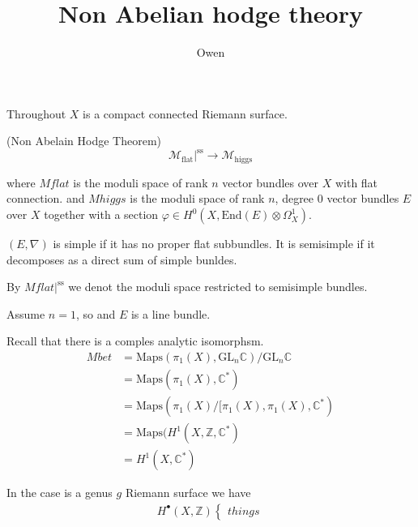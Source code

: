 % 


\title{Non Abelian hodge theory}
\author{Owen}
\date{}

 
\maketitle

Throughout $X$ is  a compact connected Riemann surface. 


\begin{theorem}
    (Non Abelain Hodge Theorem)
    \begin{equation}
        \mathcal{M}_{\mathrm{flat}}|^{\mathrm{ss}} \rightarrow  \mathcal{M}_{\mathrm{higgs}} 
    \end{equation}
\end{theorem}

where $Mflat$ is the moduli space of rank $n$ vector bundles over $X$ with flat connection. 
and $Mhiggs$ is the moduli space of rank $n$, degree $0$ vector bundles $E$ over $X$ together with a section $\varphi \in H^0 (X, \mathrm{End}(E) \otimes \Omega^1 _X) $. 

\begin{definition}
    $(E, \nabla)$ is simple if it has no proper flat subbundles. 
    It is semisimple if it decomposes as a direct sum of simple bunldes. 
\end{definition}
By $ Mflat|^{\mathrm{ss}} $ we denot the moduli space restricted to semisimple bundles. 

Assume $n=1$, so and $E$ is a line bundle. 

Recall that there is a comples analytic isomorphsm. 
\begin{align}
    Mbet & = \mathrm{Maps}(\pi_1 ( X) , \mathrm{GL}_n \mathbb{C} ) / \mathrm{GL}_n \mathbb{C}  \\
    & = \mathrm{Maps}(\pi_1 ( X) , \mathbb{C} ^*) \\
    & = \mathrm{Maps}(\pi_1 ( X)/[\pi_1(X) , \pi_1(X) , \mathbb{C} ^*) \\
    & = \mathrm{Maps}(H^1(X, \mathbb{Z} , \mathbb{C} ^*) \\
    & = H^1(X, \mathbb{C} ^*) 
\end{align}

In the case is a genus $g$ Riemann surface we have 
\begin{align}
    H^\bullet (X, \mathbb{Z} ) \begin{cases}
        things 
    \end{cases} 
\end{align}

